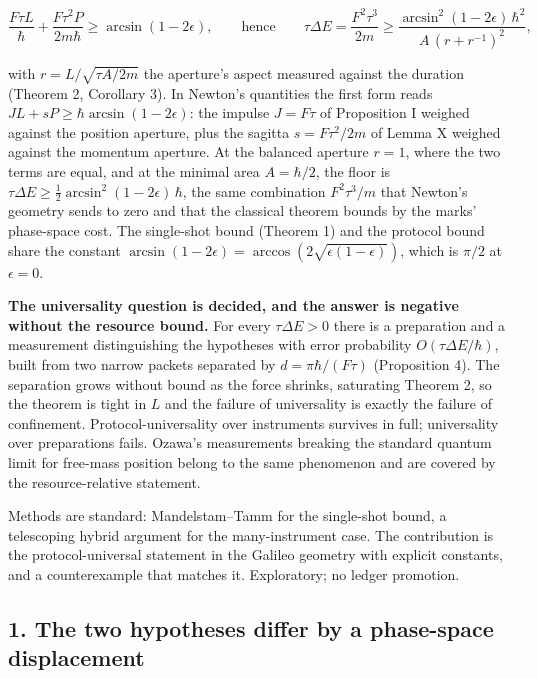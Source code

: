\documentclass[11pt,a4paper]{article}
\begin{document}
\[\boxed{\frac{F\tau L}{\hbar}+\frac{F\tau^2P}{2m\hbar}\ge\arcsin(1-2\epsilon),
\qquad\text{hence}\qquad
\tau\Delta E=\frac{F^2\tau^3}{2m}\ge\frac{\arcsin^2(1-2\epsilon)\,\hbar^2}{A\,(r+r^{-1})^2},}\]

with \(r=L/\sqrt{\tau A/2m}\) the aperture's aspect measured against the
duration (Theorem 2, Corollary 3). In Newton's quantities the first form
reads \(J L+sP\ge\hbar\arcsin(1-2\epsilon)\): the impulse \(J=F\tau\) of
Proposition I weighed against the position aperture, plus the sagitta
\(s=F\tau^2/2m\) of Lemma X weighed against the momentum aperture. At
the balanced aperture \(r=1\), where the two terms are equal, and at the
minimal area \(A=\hbar/2\), the floor is
\(\tau\Delta E\ge\frac12\arcsin^2(1-2\epsilon)\,\hbar\), the same
combination \(F^2\tau^3/m\) that Newton's geometry sends to zero and
that the classical theorem bounds by the marks' phase-space cost. The
single-shot bound (Theorem 1) and the protocol bound share the constant
\(\arcsin(1-2\epsilon)=\arccos(2\sqrt{\epsilon(1-\epsilon)})\), which is
\(\pi/2\) at \(\epsilon=0\).

\textbf{The universality question is decided, and the answer is negative
without the resource bound.} For every \(\tau\Delta E>0\) there is a
preparation and a measurement distinguishing the hypotheses with error
probability \(O(\tau\Delta E/\hbar)\), built from two narrow packets
separated by \(d=\pi\hbar/(F\tau)\) (Proposition 4). The separation
grows without bound as the force shrinks, saturating Theorem 2, so the
theorem is tight in \(L\) and the failure of universality is exactly the
failure of confinement. Protocol-universality over instruments survives
in full; universality over preparations fails. Ozawa's measurements
breaking the standard quantum limit for free-mass position belong to the
same phenomenon and are covered by the resource-relative statement.

Methods are standard: Mandelstam--Tamm for the single-shot bound, a
telescoping hybrid argument for the many-instrument case. The
contribution is the protocol-universal statement in the Galileo geometry
with explicit constants, and a counterexample that matches it.
Exploratory; no ledger promotion.

\hypertarget{the-two-hypotheses-differ-by-a-phase-space-displacement}{%
\subsection{1. The two hypotheses differ by a phase-space
displacement}\label{the-two-hypotheses-differ-by-a-phase-space-displacement}}
\end{document}
